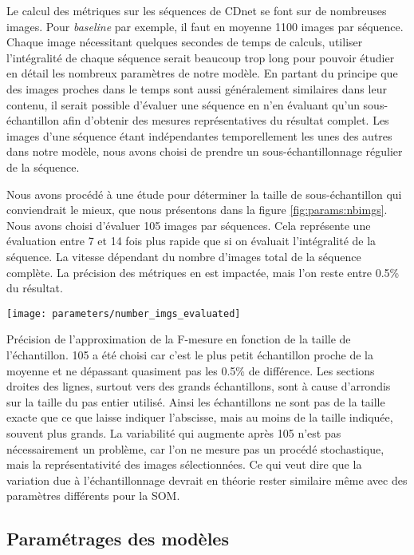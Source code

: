 	Le calcul des métriques sur les séquences de CDnet se font sur de nombreuses images. Pour \textit{baseline} par exemple, il faut en moyenne 1100 images par séquence. Chaque image nécessitant quelques secondes de temps de calculs, utiliser l'intégralité de chaque séquence serait beaucoup trop long pour pouvoir étudier en détail les nombreux paramètres de notre modèle. En partant du principe que des images proches dans le temps sont aussi généralement similaires dans leur contenu, il serait possible d'évaluer une séquence en n'en évaluant qu'un sous-échantillon afin d'obtenir des mesures représentatives du résultat complet. Les images d'une séquence étant indépendantes temporellement les unes des autres dans notre modèle, nous avons choisi de prendre un sous-échantillonnage régulier de la séquence.
	
	Nous avons procédé à une étude pour déterminer la taille de sous-échantillon qui conviendrait le mieux, que nous présentons dans la figure \ref{fig:params:nbimgs}. Nous avons choisi d'évaluer 105 images par séquences. Cela représente une évaluation entre 7 et 14 fois plus rapide que si on évaluait l'intégralité de la séquence. La vitesse dépendant du nombre d'images total de la séquence complète. La précision des métriques en est impactée, mais l'on reste entre 0.5\% du résultat.

	\begin{figureth}
		\texttt{[image: parameters/number\_imgs\_evaluated]}
		\caption[Échantillonnage de l'évaluation]{Précision de l'approximation de la F-mesure en fonction de la taille de l'échantillon. 105 a été choisi car c'est le plus petit échantillon proche de la moyenne et ne dépassant quasiment pas les 0.5\% de différence. Les sections droites des lignes, surtout vers des grands échantillons, sont à cause d'arrondis sur la taille du pas entier utilisé. Ainsi les échantillons ne sont pas de la taille exacte que ce que laisse indiquer l'abscisse, mais au moins de la taille indiquée, souvent plus grands. La variabilité qui augmente après 105 n'est pas nécessairement un problème, car l'on ne mesure pas un procédé stochastique, mais la représentativité des images sélectionnées. Ce qui veut dire que la variation due à l'échantillonnage devrait en théorie rester similaire même avec des paramètres différents pour la SOM.}\label{fig:params:nbimgs}
	\end{figureth}

	\subsection{Paramétrages des modèles}

